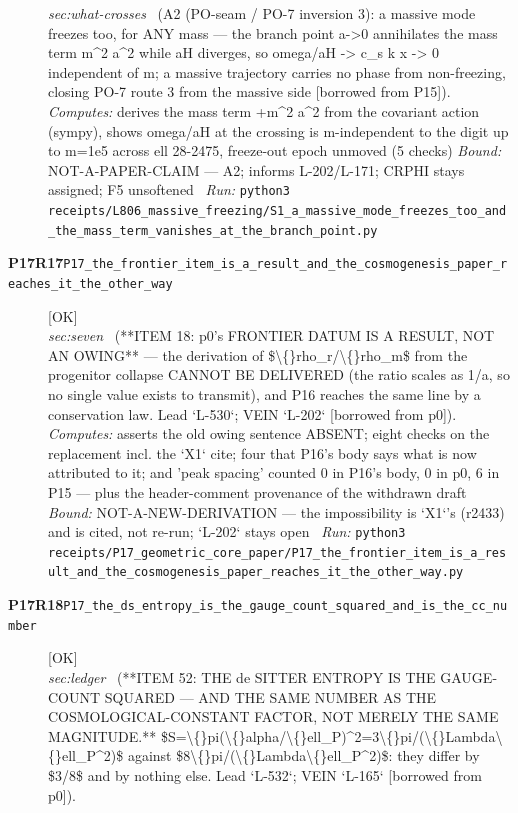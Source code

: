 \begin{description}
\textit{sec:what-crosses} \ (A2 (PO-seam / PO-7 inversion 3): a massive mode freezes too, for ANY mass --- the branch point a->0 annihilates the mass term m\textasciicircum{}2 a\textasciicircum{}2 while \textbar{}aH\textbar{} diverges, so omega/\textbar{}aH\textbar{} -> c\_s k x -> 0 independent of m; a massive trajectory carries no phase from non-freezing, closing PO-7 route 3 from the massive side [borrowed from P15]). 
\emph{Computes:} derives the mass term +m\textasciicircum{}2 a\textasciicircum{}2 from the covariant action (sympy), shows omega/\textbar{}aH\textbar{} at the crossing is m-independent to the digit up to m=1e5 across ell 28-2475, freeze-out epoch unmoved (5 checks)
 \emph{Bound:} NOT-A-PAPER-CLAIM --- A2; informs L-202/L-171; CRPHI stays assigned; F5 unsoftened
\ \emph{Run:} \texttt{python3 receipts/L806\_massive\_freezing/S1\_a\_massive\_mode\_freezes\_too\_and\_the\_mass\_term\_vanishes\_at\_the\_branch\_point.py}
\item[\rcptlabel{P17_the_frontier_item_is_a_result_and_the_cosmogenesis_paper_reaches_it_the_other_way}{P17R17}\textbf{P17R17}\quad\texttt{P17\_the\_frontier\_item\_is\_a\_result\_and\_the\_cosmogenesis\_paper\_reaches\_it\_the\_other\_way}]\hfill\textsf{[OK]}\\
\textit{sec:seven} \ (**ITEM 18: p0's FRONTIER DATUM IS A RESULT, NOT AN OWING** --- the derivation of \$\textbackslash\{\}rho\_r/\textbackslash\{\}rho\_m\$ from the progenitor collapse CANNOT BE DELIVERED (the ratio scales as 1/a, so no single value exists to transmit), and P16 reaches the same line by a conservation law. Lead `L-530`; VEIN `L-202` [borrowed from p0]). 
\emph{Computes:} asserts the old owing sentence ABSENT; eight checks on the replacement incl. the `X1` cite; four that P16's body says what is now attributed to it; and 'peak spacing' counted 0 in P16's body, 0 in p0, 6 in P15 --- plus the header-comment provenance of the withdrawn draft
 \emph{Bound:} NOT-A-NEW-DERIVATION --- the impossibility is `X1`'s (r2433) and is cited, not re-run; `L-202` stays open
\ \emph{Run:} \texttt{python3 receipts/P17\_geometric\_core\_paper/P17\_the\_frontier\_item\_is\_a\_result\_and\_the\_cosmogenesis\_paper\_reaches\_it\_the\_other\_way.py}
\item[\rcptlabel{P17_the_ds_entropy_is_the_gauge_count_squared_and_is_the_cc_number}{P17R18}\textbf{P17R18}\quad\texttt{P17\_the\_ds\_entropy\_is\_the\_gauge\_count\_squared\_and\_is\_the\_cc\_number}]\hfill\textsf{[OK]}\\
\textit{sec:ledger} \ (**ITEM 52: THE de SITTER ENTROPY IS THE GAUGE-COUNT SQUARED --- AND THE SAME NUMBER AS THE COSMOLOGICAL-CONSTANT FACTOR, NOT MERELY THE SAME MAGNITUDE.** \$S=\textbackslash\{\}pi(\textbackslash\{\}alpha/\textbackslash\{\}ell\_P)\textasciicircum{}2=3\textbackslash\{\}pi/(\textbackslash\{\}Lambda\textbackslash\{\}ell\_P\textasciicircum{}2)\$ against \$8\textbackslash\{\}pi/(\textbackslash\{\}Lambda\textbackslash\{\}ell\_P\textasciicircum{}2)\$: they differ by \$3/8\$ and by nothing else. Lead `L-532`; VEIN `L-165` [borrowed from p0]). 

\end{description}

